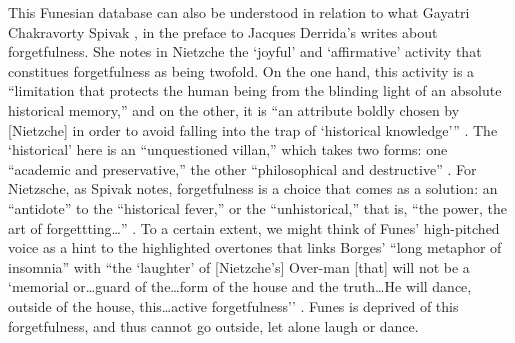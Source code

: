 This Funesian database can also be understood in relation to what Gayatri Chakravorty Spivak \parencite{Der76:Of}, in the preface to Jacques Derrida's  writes about forgetfulness. She notes in Nietzche the `joyful' and `affirmative' activity that constitues forgetfulness as being twofold. On the one hand, this activity is a ``limitation that protects the human being from the blinding light of an absolute historical memory,'' and on the other, it is ``an attribute boldly chosen by [Nietzche] in order to avoid falling into the trap of `historical knowledge''' \parencite[xxxi]{Der76:Of}. The `historical' here is an ``unquestioned villan,'' which takes two forms: one ``academic and preservative,'' the other ``philosophical and destructive'' \parencite[xxxi]{Der76:Of}. For Nietzsche, as Spivak notes, forgetfulness is a choice that comes as a solution: an ``antidote'' to the ``historical fever,'' or the ``unhistorical,'' that is, ``the power, the art of forgettting\dots'' \parencite[xxxi]{Der76:Of}. To a certain extent, we might think of Funes' high-pitched voice as a hint to the highlighted overtones that links Borges' ``long metaphor of insomnia'' with ``the `laughter' of [Nietzche's] Over-man [that] will not be a `memorial or\dots guard of the\dots form of the house and the truth\dots He will dance, outside of the house, this\dots active forgetfulness'' \parencite[xxxii]{Der76:Of}. Funes is deprived of this forgetfulness, and thus cannot go outside, let alone laugh or dance.



